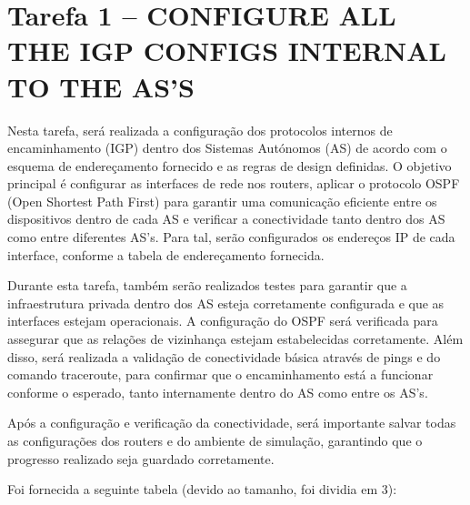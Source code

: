 \documentclass[11pt,english, openright, oneside]{book}
\begin{document}
\section{Tarefa 1 -- CONFIGURE ALL THE IGP CONFIGS INTERNAL TO THE AS’S}
\vspace{0.2cm}

Nesta tarefa, será realizada a configuração dos protocolos internos de encaminhamento (IGP) dentro dos Sistemas Autónomos (AS) de acordo com o esquema de endereçamento fornecido e as regras de design definidas. O objetivo principal é configurar as interfaces de rede nos routers, aplicar o protocolo OSPF (Open Shortest Path First) para garantir uma comunicação eficiente entre os dispositivos dentro de cada AS e verificar a conectividade tanto dentro dos AS como entre diferentes AS’s. Para tal, serão configurados os endereços IP de cada interface, conforme a tabela de endereçamento fornecida.
\vspace{0.2cm}

Durante esta tarefa, também serão realizados testes para garantir que a infraestrutura privada dentro dos AS esteja corretamente configurada e que as interfaces estejam operacionais. A configuração do OSPF será verificada para assegurar que as relações de vizinhança estejam estabelecidas corretamente. Além disso, será realizada a validação de conectividade básica através de pings e do comando traceroute, para confirmar que o encaminhamento está a funcionar conforme o esperado, tanto internamente dentro do AS como entre os AS’s.
\vspace{0.2cm}

Após a configuração e verificação da conectividade, será importante salvar todas as configurações dos routers e do ambiente de simulação, garantindo que o progresso realizado seja guardado corretamente.

\vspace{0.2cm}

Foi fornecida a seguinte tabela (devido ao tamanho, foi dividia em 3):
\end{document}
